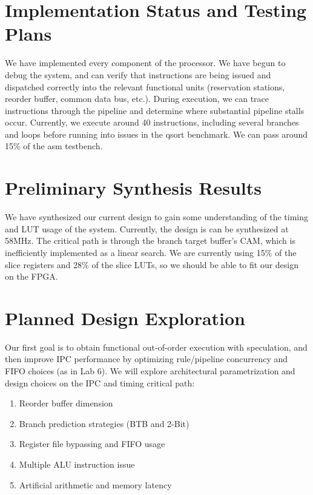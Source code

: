 \documentclass[12pt]{article}
\begin{document}
    \section{Implementation Status and Testing Plans}

    We have implemented every component of the processor. We have begun to debug
the system, and can verify that instructions are being issued and dispatched
correctly into the relevant functional units (reservation stations, reorder
buffer, common data bus, etc.). During execution, we can trace instructions
through the pipeline and determine where substantial pipeline stalls occur.
Currently, we execute around 40 instructions, including several branches and
loops before running into issues in the qsort benchmark. We can pass around
15\% of the asm testbench.

    \section{Preliminary Synthesis Results}

    We have synthesized our current design to gain some understanding of the timing and
    LUT usage of the system. Currently, the design is can be synthesized at 58MHz.
    The critical path is through the branch target buffer's CAM, which is inefficiently
    implemented as a linear search. We are currently using 15\% of the slice registers and 28\% of the slice LUTs,
    so we should be able to fit our design on the FPGA.

    \section{Planned Design Exploration}
    
    Our first goal is to obtain functional out-of-order execution with
    speculation, and then improve IPC performance by optimizing rule/pipeline
    concurrency and FIFO choices (as in Lab 6). We will explore architectural
    parametrization and design choices on the IPC and timing critical path:  
    
    \begin{enumerate}
        \item Reorder buffer dimension
        \item Branch prediction strategies (BTB and 2-Bit)
        \item Register file bypassing and FIFO usage
        \item Multiple ALU instruction issue
        \item Artificial arithmetic and memory latency
    \end{enumerate}
    
    
    
    

 
\end{document}
